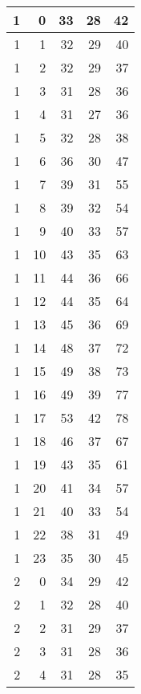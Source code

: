     \begin{longtable}{|r|r|r|r|r|}
		\hline
    1     & 0     & 33    & 28    & 42 \\\hline
    1     & 1     & 32    & 29    & 40 \\\hline
    1     & 2     & 32    & 29    & 37 \\\hline
    1     & 3     & 31    & 28    & 36 \\\hline
    1     & 4     & 31    & 27    & 36 \\\hline
    1     & 5     & 32    & 28    & 38 \\\hline
    1     & 6     & 36    & 30    & 47 \\\hline
    1     & 7     & 39    & 31    & 55 \\\hline
    1     & 8     & 39    & 32    & 54 \\\hline
    1     & 9     & 40    & 33    & 57 \\\hline
    1     & 10    & 43    & 35    & 63 \\\hline
    1     & 11    & 44    & 36    & 66 \\\hline
    1     & 12    & 44    & 35    & 64 \\\hline
    1     & 13    & 45    & 36    & 69 \\\hline
    1     & 14    & 48    & 37    & 72 \\\hline
    1     & 15    & 49    & 38    & 73 \\\hline
    1     & 16    & 49    & 39    & 77 \\\hline
    1     & 17    & 53    & 42    & 78 \\\hline
    1     & 18    & 46    & 37    & 67 \\\hline
    1     & 19    & 43    & 35    & 61 \\\hline
    1     & 20    & 41    & 34    & 57 \\\hline
    1     & 21    & 40    & 33    & 54 \\\hline
    1     & 22    & 38    & 31    & 49 \\\hline
    1     & 23    & 35    & 30    & 45 \\\hline
    2     & 0     & 34    & 29    & 42 \\\hline
    2     & 1     & 32    & 28    & 40 \\\hline
    2     & 2     & 31    & 29    & 37 \\\hline
    2     & 3     & 31    & 28    & 36 \\\hline
    2     & 4     & 31    & 28    & 35 \\\hline

\end{longtable}
